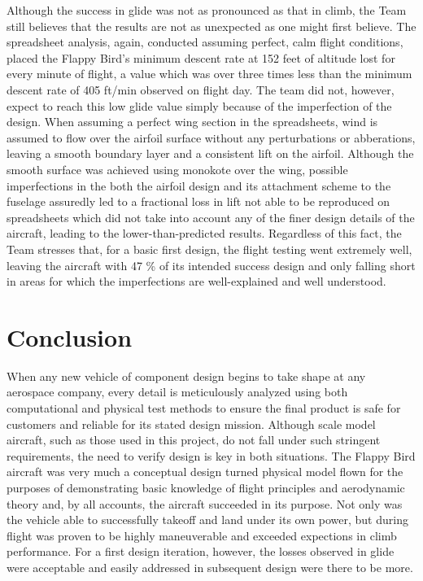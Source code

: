 \documentclass[titlepage]{article}
\begin{document}
Although the success in glide was not as pronounced as that in climb, the Team still believes that the results are not as unexpected as one might first believe. The spreadsheet analysis, again, conducted assuming perfect, calm flight conditions, placed the Flappy Bird's minimum descent rate at 152 feet of altitude lost for every minute of flight, a value which was over three times less than the minimum descent rate of 405 ft/min observed on flight day. The team did not, however, expect to reach this low glide value simply because of the imperfection of the design. When assuming a perfect wing section in the spreadsheets, wind is assumed to flow over the airfoil surface without any perturbations or abberations, leaving a smooth boundary layer and a consistent lift on the airfoil. Although the smooth surface was achieved using monokote over the wing, possible imperfections in the both the airfoil design and its attachment scheme to the fuselage assuredly led to a fractional loss in lift not able to be reproduced on spreadsheets which did not take into account any of the finer design details of the aircraft, leading to the lower-than-predicted results. Regardless of this fact, the Team stresses that, for a basic first design, the flight testing went extremely well, leaving the aircraft with 47 \% of its intended success design and only falling short in areas for which the imperfections are well-explained and well understood. 

\section{Conclusion}
When any new vehicle of component design begins to take shape at any aerospace company, every detail is meticulously analyzed using both computational and physical test methods to ensure the final product is safe for customers and reliable for its stated design mission. Although scale model aircraft, such as those used in this project, do not fall under such stringent requirements, the need to verify design is key in both situations. The Flappy Bird aircraft was very much a conceptual design turned physical model flown for the purposes of demonstrating basic knowledge of flight principles and aerodynamic theory and, by all accounts, the aircraft succeeded in its purpose. Not only was the vehicle able to successfully takeoff and land under its own power, but during flight was proven to be highly maneuverable and exceeded expections in climb performance. For a first design iteration, however, the losses observed in glide were acceptable and easily addressed in subsequent design were there to be more. 
\end{document}
